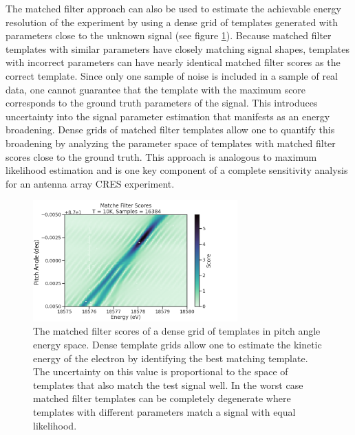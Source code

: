 The matched filter approach can also be used to estimate the achievable energy resolution of the experiment by using a dense grid of templates generated with parameters close to the unknown signal (see figure \ref{fig:chap4-mf-score-dense-grid}). Because matched filter templates with similar parameters have closely matching signal shapes, templates with incorrect parameters can have nearly identical matched filter scores as the correct template. Since only one sample of noise is included in a sample of real data, one cannot guarantee that the template with the maximum score corresponds to the ground truth parameters of the signal. This introduces uncertainty into the signal parameter estimation that manifests as an energy broadening. Dense grids of matched filter templates allow one to quantify this broadening by analyzing the parameter space of templates with matched filter scores close to the ground truth. This approach is analogous to maximum likelihood estimation and is one key component of a complete sensitivity analysis for an antenna array CRES experiment.

\begin{figure}[htbp]
    \centering
    \includegraphics*[width=0.7\textwidth]{figs/Chapter-4/230725_example_mf_score_map.png}
    \caption{\label{fig:chap4-mf-score-dense-grid} The matched filter scores of a dense grid of templates in pitch angle energy space. Dense template grids allow one to estimate the kinetic energy of the electron by identifying the best matching template. The uncertainty on this value is proportional to the space of templates that also match the test signal well. In the worst case matched filter templates can be completely degenerate where templates with different parameters match a signal with equal likelihood. }
\end{figure}

